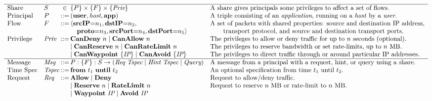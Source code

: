\begin{table}
\centering 
\begin{small}
\[
\begin{array}{ll@{\,}c@{\,}ll}
\hline
\textrm{Share} & S & \in & 
%
\{P\} \times \{F\} \times \{ \panepriv \} & 
%
  \textrm{A share gives principals some privileges to
    affect a set of flows.} \\
%
\textrm{Principal} & P & \mathord{::=} &
%
\paneprin{\textrm{user}}{\textrm{host}}{\textrm{app}} &
% 
  \textrm{A triple consisting of an \emph{application}, running on a
    \emph{host} by a \emph{user}.} \\
%
\textrm{Flow} & F & \mathord{::=} & \langle\textbf{srcIP}\mathord{=}n_1,\textbf{dstIP}\mathord{=}n_2, &
%
  \textrm{A set of packets with shared properties: source and destination IP address,} \\
%
& & & \quad\textbf{proto}\mathord{=}n_3,\textbf{srcPort}\mathord{=}n_4,\textbf{dstPort}\mathord{=}n_5\rangle &
%
  \qquad\textrm{transport protocol, and source and destination transport ports.}\\
%
\textrm{Privilege} & \panepriv & ::= &
%
\textbf{CanDeny}~n \mid \textbf{CanAllow}~n &
%
\textrm{The privileges to allow or deny traffic for up to $n$ seconds (optional).} \\
%
& & & \mid \textbf{CanReserve}~n \mid \textbf{CanRateLimit}~n & 
%
  \textrm{The privileges to reserve bandwidth or set rate-limits, up to
    $n$ MB.} \\
& & & \mid \textbf{CanWaypoint}~\{\textit{IP}\}\mid \textbf{CanAvoid}~\{\textit{IP}\} & 
%
  \textrm{The privileges to direct traffic through or around particular IP addresses.} \\
\hline
%
\textrm{Message} & \textit{Msg} & \mathord{::=} &
%
P:\{F\} : S \rightarrow ( \panereq~\panetspec \mid \panehint~\panetspec \mid \panequery) &
%
\textrm{A message from a principal with a request, hint, or query using a share.} \\
%
\textrm{Time Spec} & \panetspec & ::= & \textbf{from}~t_1~\textbf{until}~t_2 &
%
\textrm{An optional specification from time $t_1$ until $t_2$.} \\
%
\textrm{Request} & \panereq & \mathord{::=} & 
%
\textbf{Allow} \mid \textbf{Deny} &
%
\textrm{Request to allow/deny traffic.}
\\
%
& & &  \mid \textbf{Reserve}~n \mid \textbf{RateLimit}~n~ &
%
  \textrm{Request to reserve $n$ MB or rate-limit to $n$ MB.} \\
%
& & & \mid \textbf{Waypoint}~\textit{IP} \mid \textbf{Avoid}~\textit{IP} &

\end{array}\]
\end{small}
\end{table}
